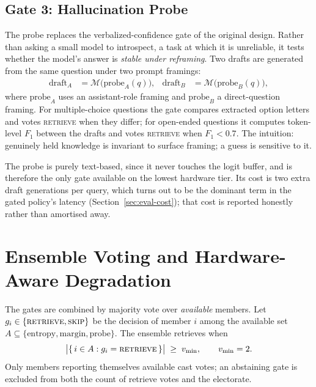 \subsection{Gate 3: Hallucination Probe}
\label{sec:method-gate-probe}

The probe replaces the verbalized-confidence gate of the original design.
Rather than asking a small model to introspect, a task at which it is
unreliable, it tests whether the model's answer is \emph{stable under
reframing}. Two drafts are generated from the same question under two prompt
framings:
\begin{align*}
  \text{draft}_A &= \mathcal{M}\bigl(\text{probe}_A(q)\bigr), &
  \text{draft}_B &= \mathcal{M}\bigl(\text{probe}_B(q)\bigr),
\end{align*}
where $\text{probe}_A$ uses an assistant-role framing and $\text{probe}_B$ a
direct-question framing. For multiple-choice questions the gate compares
extracted option letters and votes \textsc{retrieve} when they differ; for
open-ended questions it computes token-level $F_1$ between the drafts and
votes \textsc{retrieve} when $F_1 < 0.7$. The intuition: genuinely held
knowledge is invariant to surface framing; a guess is sensitive to it.

The probe is purely text-based, since it never touches the logit buffer, and
is therefore the only gate available on the lowest hardware tier. Its cost is
two extra draft generations per query, which turns out to be the dominant
term in the gated policy's latency (Section~\ref{sec:eval-cost}); that cost
is reported honestly rather than amortised away.

\section{Ensemble Voting and Hardware-Aware Degradation}
\label{sec:method-ensemble}

The gates are combined by majority vote over \emph{available} members. Let
$g_i \in \{\textsc{retrieve}, \textsc{skip}\}$ be the decision of member $i$
among the available set
$A \subseteq \{\text{entropy}, \text{margin}, \text{probe}\}$. The ensemble
retrieves when
\begin{equation}
  \bigl|\{\, i \in A : g_i = \textsc{retrieve} \,\}\bigr| \;\ge\; v_{\min},
  \qquad v_{\min} = 2 .
  \label{eq:vote}
\end{equation}
Only members reporting themselves available cast votes; an abstaining gate is
excluded from both the count of retrieve votes and the electorate.

